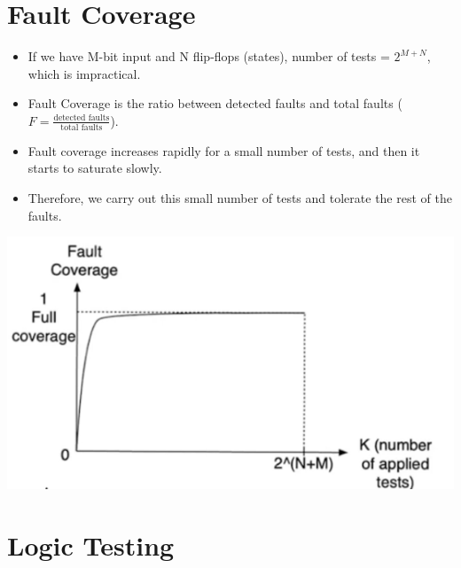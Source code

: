 \documentclass[11pt]{article}
\begin{document}
\section*{Fault Coverage}
\begin{minipage}{0.5\linewidth}
    \begin{itemize}
        \item If we have M-bit input and N flip-flops (states), number of tests = $2^{M+N}$, which is impractical.
        \item Fault Coverage is the ratio between detected faults and total faults ($F=\frac{\text{detected faults}}{\text{total faults}}$).
        \item Fault coverage increases rapidly for a small number of tests, and then it starts to saturate slowly.
        \item Therefore, we carry out this small number of tests and tolerate the rest of the faults. 
    \end{itemize}
\end{minipage}
\hfill
\begin{minipage}{0.45\linewidth}
    \begin{center}
        \includegraphics[scale=0.35]{2.png}
    \end{center}
\end{minipage}

\section*{Logic Testing}
\end{document}
